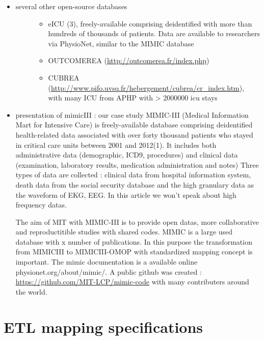\begin{itemize}
\item
  \begin{description}
  \item[several other open-source databases]
  \begin{itemize}
  \tightlist
  \item
    eICU (3), freely-available comprising deidentified with more than
    hundreds of thousands of patients. Data are available to researchers
    via PhysioNet, similar to the MIMIC database
  \item
    OUTCOMEREA (\url{http://outcomerea.fr/index.php})
  \item
    CUBREA
    (\url{http://www.pifo.uvsq.fr/hebergement/cubrea/cr_index.htm}),
    with many ICU from APHP with \textgreater{} 2000000 icu stays
  \end{itemize}
  \end{description}
\item
  presentation of mimicIII : our case study MIMIC-III (Medical
  Information Mart for Intensive Care) is freely-available database
  comprising deidentified health-related data associated with over forty
  thousand patients who stayed in critical care units between 2001 and
  2012(1). It includes both administrative data (demographic, ICD9,
  procedures) and clinical data (examination, laboratory results,
  medication administration and notes) Three types of data are collected
  : clinical data from hospital information system, death data from the
  social security database and the high granulary data as the waveform
  of EKG, EEG. In this article we won't speak about high frequency
  datas.

  The aim of MIT with MIMIC-III is to provide open datas, more
  collaborative and reproductitible studies with shared codes. MIMIC is
  a large used database with x number of publications. In this purpose
  the transformation from MIMICIII to MIMICIII-OMOP with standardized
  mapping concept is important. The mimic documentation is a available
  online physionet.org/about/mimic/. A public github was created :
  \url{https://github.com/MIT-LCP/mimic-code} with many contributers
  around the world.
\end{itemize}

\section{ETL mapping specifications}\label{etl-mapping-specifications}

